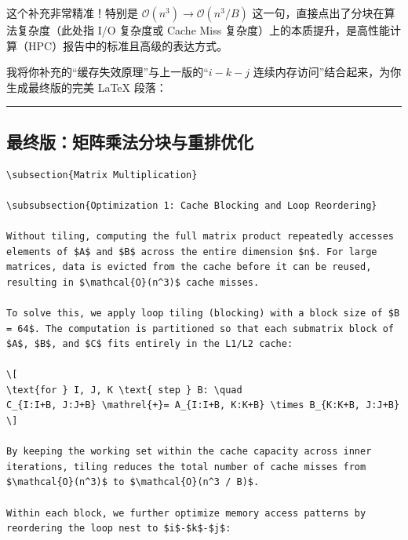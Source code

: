 \documentclass[11pt, a4paper]{article}
\begin{document}
\begin{aibox}
这个补充非常精准！特别是 $\mathcal{O}(n^3) \to \mathcal{O}(n^3 / B)$ 这一句，直接点出了分块在算法复杂度（此处指 I/O 复杂度或 Cache Miss 复杂度）上的本质提升，是高性能计算（HPC）报告中的标准且高级的表达方式。

我将你补充的“缓存失效原理”与上一版的“$i-k-j$ 连续内存访问”结合起来，为你生成最终版的完美 LaTeX 段落：

\begin{center}\rule{\textwidth}{0.4pt}\end{center}

\subsection*{最终版：矩阵乘法分块与重排优化}

\begin{tcolorbox}[colback=white,colframe=gray!50!white,boxrule=0.5pt,arc=2pt,left=5pt,right=5pt,top=5pt,bottom=5pt]
\begin{verbatim}
\subsection{Matrix Multiplication}

\subsubsection{Optimization 1: Cache Blocking and Loop Reordering}

Without tiling, computing the full matrix product repeatedly accesses elements of $A$ and $B$ across the entire dimension $n$. For large matrices, data is evicted from the cache before it can be reused, resulting in $\mathcal{O}(n^3)$ cache misses. 

To solve this, we apply loop tiling (blocking) with a block size of $B = 64$. The computation is partitioned so that each submatrix block of $A$, $B$, and $C$ fits entirely in the L1/L2 cache:

\[
\text{for } I, J, K \text{ step } B: \quad
C_{I:I+B, J:J+B} \mathrel{+}= A_{I:I+B, K:K+B} \times B_{K:K+B, J:J+B}
\]

By keeping the working set within the cache capacity across inner iterations, tiling reduces the total number of cache misses from $\mathcal{O}(n^3)$ to $\mathcal{O}(n^3 / B)$.

Within each block, we further optimize memory access patterns by reordering the loop nest to $i$-$k$-$j$:


\end{verbatim}
\end{tcolorbox}
\end{aibox}
\end{document}

